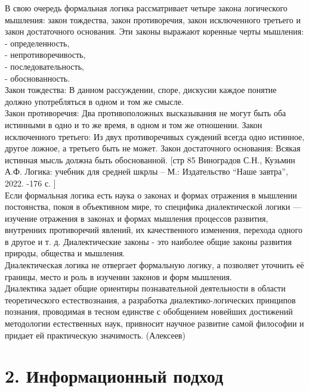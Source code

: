 \documentclass[a4paper,12pt]{report}
\begin{document}
В свою очередь формальная логика рассматривает четыре закона логического мышления: закон тождества, закон противоречия, закон исключенного третьего и закон достаточного основания. Эти законы выражают коренные черты мышления: \\
- определенность, \\
- непротиворечивость, \\
- последовательность, \\
- обоснованность.\\
Закон тождества: В данном рассуждении, споре, дискусии каждое понятие должно употребляться в одном и том же смысле.\\
Закон противоречия: Два противоположных высказывания не могут быть оба истинными в одно и то же время, в одном и том же отношении.
Закон исключенного третьего: Из двух противоречивых суждений всегда одно истинное, другое ложное, а третьего быть не может.
Закон достаточного основания: Всякая истинная мысль должна быть обоснованной. [стр 85 Виноградов С.Н., Кузьмин А.Ф. Логика: учебник для средней шкрлы – М.: Издательство “Наше завтра”, 2022. -176 с. ]\\
	Если формальная логика есть наука о законах и формах отражения в мышлении постоянства, покоя в объективном мире, то специфика диалектической логики — изучение отражения в законах и формах мышления процессов развития, внутренних противоречий явлений, их качественного изменения, перехода одного в другое и т. д.  Диалектические законы - это наиболее общие законы развития природы, общества и мышления.\\ Диалектическая логика не отвергает формальную логику, а позволяет уточнить её границы, место и роль в изучении законов и форм мышления. \\
Диалектика задает общие ориентиры познавательной деятельности в области теоретического естествознания, а разработка диалектико-логических принципов познания, проводимая в тесном единстве с обобщением новейших достижений методологии естественных наук, привносит научное развитие самой философии и придает ей практическую значимость. (Алексеев) \\


 \chapter*{2. Информационный подход }
  \\
\end{document}

